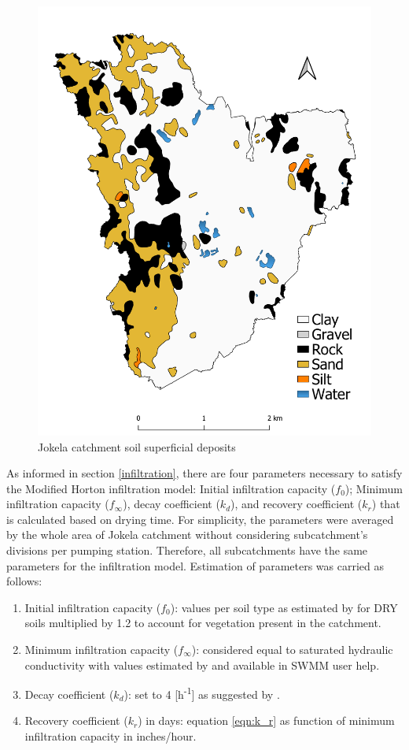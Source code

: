 \begin{figure}[h]
    \centering
	\includegraphics[scale=0.4]{figures/Jokela_Superficial_Deposits.pdf}
	\caption{Jokela catchment soil superficial deposits}
	\label{fig:supdeposits}
\end{figure}

As informed in section \ref{infiltration}, there are four parameters necessary to satisfy the Modified Horton infiltration model: Initial infiltration capacity ($f_0$); Minimum infiltration capacity ($f_\infty$), decay coefficient ($k_d$), and recovery coefficient ($k_r$) that is calculated based on drying time. For simplicity, the parameters were averaged by the whole area of Jokela catchment without considering subcatchment's divisions per pumping station. Therefore, all subcatchments have the same parameters for the infiltration model. Estimation of parameters was carried as follows:
\begin{enumerate}
    \item Initial infiltration capacity ($f_0$): values per soil type as estimated by \citet{Rossman2016} for DRY soils multiplied by 1.2 to account for vegetation present in the catchment.
    \item Minimum infiltration capacity ($f_\infty$): considered equal to saturated hydraulic conductivity with values estimated by \citet{Rawls1983} and available in SWMM user help.
    \item Decay coefficient ($k_d$): set to 4 [h\textsuperscript{-1}] as suggested by \citet{Rossman2016}.
    \item Recovery coefficient ($k_r$) in days: equation \ref{eqn:k_r} as function of minimum infiltration capacity in inches/hour.
\end{enumerate}

